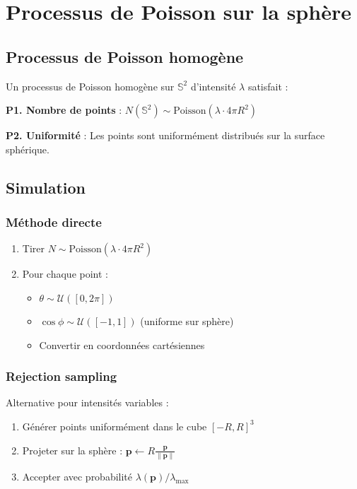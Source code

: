 \section{Processus de Poisson sur la sphère}

\subsection{Processus de Poisson homogène}

Un processus de Poisson homogène sur $\mathbb{S}^2$ d'intensité $\lambda$ satisfait :

\textbf{P1. Nombre de points} : $N(\mathbb{S}^2) \sim \text{Poisson}(\lambda \cdot 4\pi R^2)$

\textbf{P2. Uniformité} : Les points sont uniformément distribués sur la surface sphérique.

\subsection{Simulation}

\subsubsection{Méthode directe}

\begin{enumerate}
    \item Tirer $N \sim \text{Poisson}(\lambda \cdot 4\pi R^2)$
    \item Pour chaque point :
        \begin{itemize}
            \item $\theta \sim \mathcal{U}([0, 2\pi])$
            \item $\cos\phi \sim \mathcal{U}([-1, 1])$ (uniforme sur sphère)
            \item Convertir en coordonnées cartésiennes
        \end{itemize}
\end{enumerate}

\subsubsection{Rejection sampling}

Alternative pour intensités variables :
\begin{enumerate}
    \item Générer points uniformément dans le cube $[-R, R]^3$
    \item Projeter sur la sphère : $\mathbf{p} \leftarrow R \frac{\mathbf{p}}{\|\mathbf{p}\|}$
    \item Accepter avec probabilité $\lambda(\mathbf{p})/\lambda_{\max}$
\end{enumerate}

